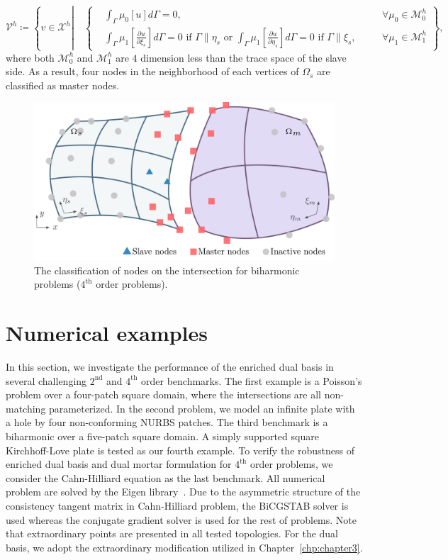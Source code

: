 \begin{equation}
	\mathcal{V}^h\coloneqq \left\{ v\in \mathcal{X}^h \left| \quad  \left\{\begin{alignedat}{2}
		&\int_{\Gamma} \mu_0 \left[ u \right] d \Gamma=0, &&\forall \mu_0\in \mathcal{M}_0^h\\
		&\int_{\Gamma} \mu_1 \left[ \frac{\partial u}{ \partial \xi_s} \right] d \Gamma=0\text{ if }\Gamma\parallel\eta_s\text{ or }\int_{\Gamma} \mu_1 \left[ \frac{\partial u}{ \partial \eta_s} \right] d\Gamma=0\text{ if }\Gamma\parallel\xi_s,\quad&&\forall\mu_1\in \mathcal{M}_1^h
	\end{alignedat}\right. \right. \right\},
\end{equation}
where both $\mathcal{M}_0^h$ and $\mathcal{M}_1^h$ are $4$ dimension less than the trace space of the slave side. As a result, four nodes in the neighborhood of each vertices of $\Omega_s$ are classified as master nodes.

\begin{figure}[ht]
	\center
	\includegraphics[width=.7\columnwidth]{two_patch_domain_biharmonic}
	\caption{The classification of nodes on the intersection for biharmonic problems ($4^\text{th}$ order problems). }
\end{figure}

\FloatBarrier

\section{Numerical examples}\label{sec:examples}

In this section, we investigate the performance of the enriched dual basis in several challenging $2^\text{nd}$ and $4^\text{th}$ order benchmarks. The first example is a Poisson's problem over a four-patch square domain, where the intersections are all non-matching parameterized. In the second problem, we model an infinite plate with a hole by four non-conforming NURBS patches. The third benchmark is a biharmonic over a five-patch square domain. A simply supported square Kirchhoff-Love plate is tested as our fourth example. To verify the robustness of enriched dual basis and dual mortar formulation for $4^\text{th}$ order problems, we consider the Cahn-Hilliard equation as the last benchmark. All numerical problem are solved by the Eigen library~\cite{eigenweb}. Due to the asymmetric structure of the consistency tangent matrix in Cahn-Hilliard problem, the BiCGSTAB solver is used whereas the conjugate gradient solver is used for the rest of problems. Note that extraordinary points are presented in all tested topologies. For the \Bezier dual basis, we adopt the extraordinary modification utilized in Chapter~\ref{chp:chapter3}.\par

